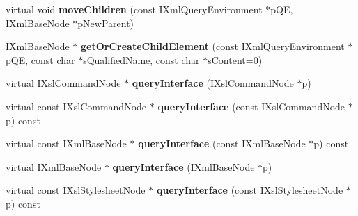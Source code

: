 \begin{DoxyCompactItemize}
\item 
\hypertarget{classgeneral__server_1_1XmlBaseNode_a75f2ffadede84f879969ea2332430309}{virtual void {\bfseries move\-Children} (const \-I\-Xml\-Query\-Environment $\ast$p\-Q\-E, \-I\-Xml\-Base\-Node $\ast$p\-New\-Parent)}\label{classgeneral__server_1_1XmlBaseNode_a75f2ffadede84f879969ea2332430309}

\item 
\hypertarget{classgeneral__server_1_1XmlBaseNode_ab138846418e8da4b9fda11b535e2defe}{\-I\-Xml\-Base\-Node $\ast$ {\bfseries get\-Or\-Create\-Child\-Element} (const \-I\-Xml\-Query\-Environment $\ast$p\-Q\-E, const char $\ast$s\-Qualified\-Name, const char $\ast$s\-Content=0)}\label{classgeneral__server_1_1XmlBaseNode_ab138846418e8da4b9fda11b535e2defe}

\item 
\hypertarget{classgeneral__server_1_1XmlBaseNode_acf51ecdcfe2554585eb24663780818cc}{virtual \-I\-Xsl\-Command\-Node $\ast$ {\bfseries query\-Interface} (\-I\-Xsl\-Command\-Node $\ast$p)}\label{classgeneral__server_1_1XmlBaseNode_acf51ecdcfe2554585eb24663780818cc}

\item 
\hypertarget{classgeneral__server_1_1XmlBaseNode_abedb313a1214c1b339882762eff8c822}{virtual const \-I\-Xsl\-Command\-Node $\ast$ {\bfseries query\-Interface} (const \-I\-Xsl\-Command\-Node $\ast$p) const }\label{classgeneral__server_1_1XmlBaseNode_abedb313a1214c1b339882762eff8c822}

\item 
\hypertarget{classgeneral__server_1_1XmlBaseNode_a5ed4da893b08e395214435c5a2989a16}{virtual const \-I\-Xml\-Base\-Node $\ast$ {\bfseries query\-Interface} (const \-I\-Xml\-Base\-Node $\ast$p) const }\label{classgeneral__server_1_1XmlBaseNode_a5ed4da893b08e395214435c5a2989a16}

\item 
\hypertarget{classgeneral__server_1_1XmlBaseNode_abf059818e6e9df579b52303e96dd9397}{virtual \-I\-Xml\-Base\-Node $\ast$ {\bfseries query\-Interface} (\-I\-Xml\-Base\-Node $\ast$p)}\label{classgeneral__server_1_1XmlBaseNode_abf059818e6e9df579b52303e96dd9397}

\item 
\hypertarget{classgeneral__server_1_1XmlBaseNode_a108f04f9259985f8a3b6b98934e437bb}{virtual const \-I\-Xsl\-Stylesheet\-Node $\ast$ {\bfseries query\-Interface} (const \-I\-Xsl\-Stylesheet\-Node $\ast$p) const }\label{classgeneral__server_1_1XmlBaseNode_a108f04f9259985f8a3b6b98934e437bb}


\end{DoxyCompactItemize}
